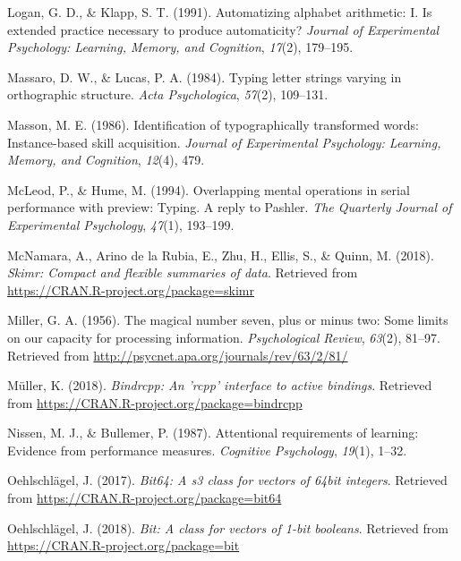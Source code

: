 \documentclass[floatsintext,man]{apa6}
\theoremstyle{definition}
\theoremstyle{definition}
\theoremstyle{definition}
\theoremstyle{remark}
\begin{document}
\hypertarget{ref-logan_automatizing_1991}{}
Logan, G. D., \& Klapp, S. T. (1991). Automatizing alphabet arithmetic:
I. Is extended practice necessary to produce automaticity? \emph{Journal
of Experimental Psychology: Learning, Memory, and Cognition},
\emph{17}(2), 179--195.

\hypertarget{ref-massaro_typing_1984}{}
Massaro, D. W., \& Lucas, P. A. (1984). Typing letter strings varying in
orthographic structure. \emph{Acta Psychologica}, \emph{57}(2),
109--131.

\hypertarget{ref-MassonIdentificationtypographicallytransformed1986}{}
Masson, M. E. (1986). Identification of typographically transformed
words: Instance-based skill acquisition. \emph{Journal of Experimental
Psychology: Learning, Memory, and Cognition}, \emph{12}(4), 479.

\hypertarget{ref-mcleod_overlapping_1994}{}
McLeod, P., \& Hume, M. (1994). Overlapping mental operations in serial
performance with preview: Typing. A reply to Pashler. \emph{The
Quarterly Journal of Experimental Psychology}, \emph{47}(1), 193--199.

\hypertarget{ref-R-skimr}{}
McNamara, A., Arino de la Rubia, E., Zhu, H., Ellis, S., \& Quinn, M.
(2018). \emph{Skimr: Compact and flexible summaries of data}. Retrieved
from \url{https://CRAN.R-project.org/package=skimr}

\hypertarget{ref-miller_magical_1956}{}
Miller, G. A. (1956). The magical number seven, plus or minus two: Some
limits on our capacity for processing information. \emph{Psychological
Review}, \emph{63}(2), 81--97. Retrieved from
\url{http://psycnet.apa.org/journals/rev/63/2/81/}

\hypertarget{ref-R-bindrcpp}{}
Müller, K. (2018). \emph{Bindrcpp: An 'rcpp' interface to active
bindings}. Retrieved from
\url{https://CRAN.R-project.org/package=bindrcpp}

\hypertarget{ref-NissenAttentionalrequirementslearning1987}{}
Nissen, M. J., \& Bullemer, P. (1987). Attentional requirements of
learning: Evidence from performance measures. \emph{Cognitive
Psychology}, \emph{19}(1), 1--32.

\hypertarget{ref-R-bit64}{}
Oehlschlägel, J. (2017). \emph{Bit64: A s3 class for vectors of 64bit
integers}. Retrieved from \url{https://CRAN.R-project.org/package=bit64}

\hypertarget{ref-R-bit}{}
Oehlschlägel, J. (2018). \emph{Bit: A class for vectors of 1-bit
booleans}. Retrieved from \url{https://CRAN.R-project.org/package=bit}
\end{document}
